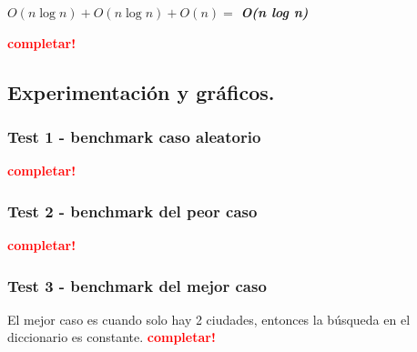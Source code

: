\begin{center}
  $O(n \log n) + O(n \log n) + O(n) =$ \textit{\textbf{O(n log n)}}
\end{center}

\textcolor{red}{\textbf{completar!}}



\newpage
\subsection{Experimentación y gráficos.}

\vspace*{0.3cm}

\subsubsection{Test 1 - benchmark caso aleatorio}

\textcolor{red}{\textbf{completar!}}


\newpage
\subsubsection{Test 2 - benchmark del peor caso}



\textcolor{red}{\textbf{completar!}}


\newpage
\subsubsection{Test 3 - benchmark del mejor caso}

El mejor caso es cuando solo hay 2 ciudades, entonces la búsqueda en el
diccionario es constante.
\textcolor{red}{\textbf{completar!}}
